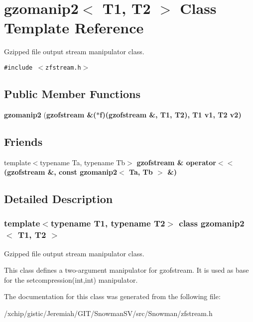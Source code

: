 \section{gzomanip2$<$ T1, T2 $>$ Class Template Reference}
\label{classgzomanip2}
Gzipped file output stream manipulator class.  


{\tt \#include $<$zfstream.h$>$}

\subsection*{Public Member Functions}
\begin{CompactItemize}
\item 
\textbf{gzomanip2} (\bf{gzofstream} \&($\ast$f)(\bf{gzofstream} \&, T1, T2), T1 v1, T2 v2)\label{classgzomanip2_37d176e6144d5c5a6c859c78fc4479ee}

\end{CompactItemize}
\subsection*{Friends}
\begin{CompactItemize}
\item 
template$<$typename Ta, typename Tb$>$ \bf{gzofstream} \& \textbf{operator$<$$<$} (\bf{gzofstream} \&, const \bf{gzomanip2}$<$ Ta, Tb $>$ \&)\label{classgzomanip2_7bef0d46170904d5c7d3a27e0ed4e4a2}

\end{CompactItemize}


\subsection{Detailed Description}
\subsubsection*{template$<$typename T1, typename T2$>$ class gzomanip2$<$ T1, T2 $>$}

Gzipped file output stream manipulator class. 

This class defines a two-argument manipulator for gzofstream. It is used as base for the setcompression(int,int) manipulator. 



The documentation for this class was generated from the following file:\begin{CompactItemize}
\item 
/xchip/gistic/Jeremiah/GIT/Snowman\-SV/src/Snowman/zfstream.h\end{CompactItemize}
